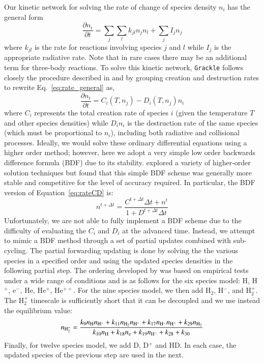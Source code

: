 Our kinetic network for solving the rate of change of species density $n_i$ has the general form
\begin{equation}
\frac{\partial n_i}{\partial t} = \sum_j \sum_l k_{jl} n_j n_l + \sum_j I_j n_j
\label{eq:rate_general}
\end{equation}
where $k_{jl}$ is the rate for reactions involving species $j$ and $l$ while $I_j$ is the appropriate radiative rate.  Note that in rare cases there may be an additional term for three-body reactions.   To solve this kinetic network, \texttt{Grackle} follows closely the procedure described in \citet{1997NewA....2..209A} and \citet{2014ApJS..211...19B} by grouping creation and destruction rates to rewrite Eq.~\ref{eq:rate_general} as,
\begin{equation}
\frac{\partial n_i}{\partial t} = C_i(T, n_j) - D_i(T, n_j) n_i
\label{eq:rateCD}
\end{equation}
where $C_i$ represents the total creation rate of species $i$ (given the temperature $T$ and other species densities) while $D_i n_i$ is the destruction rate of the same species (which must be proportional to $n_i$), including both radiative and collisional processes.  Ideally, we would solve these ordinary differential equations using a higher order method; however, here we adopt a very simple low order backwards difference formula (BDF) due to its stability.  \citet{1997NewA....2..209A} explored a variety of higher-order solution techniques but found that this simple BDF scheme was generally more stable and competitive for the level of accuracy required.  In particular, the BDF version of Equation~\ref{eq:rateCD} is:
\begin{equation}
n^{t + \Delta t} = \frac{C^{t+\Delta t} \Delta t + n^t}{1 + D^{t+\Delta t} \Delta t}
\label{eq:rate_BDF}
\end{equation}
Unfortunately, we are not able to fully implement a BDF scheme due to
the difficulty of evaluating the $C_i$ and $D_i$ at the advanced time.
Instead, we attempt to mimic a BDF method through a set of partial
updates combined with sub-cycling.  The partial forwarding updating is
done by solving the the various species in a specified order and using
the updated species densities in the following partial step.  The
ordering developed by \citet{1997NewA....2..209A} was based on empirical tests under a wide range of conditions and is as follows for the six species model: H, H$^+$, e$^-$, He, He$^+$, He$^{++}$.  For the nine species model, we then add H$_2$, H$^-$, and H$_2^+$.  The H$_2^+$ timescale is sufficiently short that it can be decoupled and we use instead the equilibrium value:
\begin{equation}
n_{ {\rm H}_2^+} = \frac{k_9 n_{\rm H} n_{\rm H^+} + k_{11} n_{\rm H_2} n_{\rm H^+} + k_{17} n_{\rm H^-} n_{\rm H^+} + k_{29} n_{\rm H_2}}
   {k_{10} n_{\rm H} + k_{18} n_{\rm e} + k_{19} n_{\rm H^-} + k_{28} + k_{30}}
\end{equation}
Finally, for twelve species model, we add D, D$^+$ and HD.  In each case, the updated species of the previous step are used in the next.  

